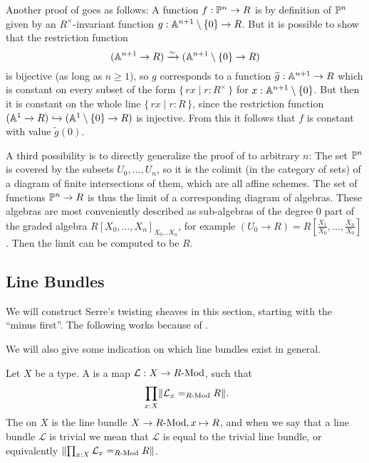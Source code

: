 \begin{remark}
  Another proof of 
  goes as follows:
  A function $f : \mathbb{P}^n \to R$
  is by definition of $\mathbb{P}^n$ given by an $R^{\times}$-invariant function
  $g : \mathbb{A}^{n+1}\setminus\{0\} \to R$.
  But it is possible to show that the restriction function
  \[ (\mathbb{A}^{n+1} \to R) \xrightarrow{\sim} (\mathbb{A}^{n+1}\setminus\{0\} \to R) \]
  is bijective
  (as long as $n \geq 1$),
  so $g$ corresponds to a function $\widetilde{g} : \mathbb{A}^{n+1} \to R$
  which is constant on every subset of the form
  $\{\, rx \mid r : R^{\times} \,\}$
  for $x : \mathbb{A}^{n+1} \setminus \{0\}$.
  But then it is constant on the whole line
  $\{\, rx \mid r : R \,\}$,
  since the restriction function
  $(\mathbb{A}^1 \to R) \hookrightarrow (\mathbb{A}^1\setminus\{0\} \to R)$
  is injective.
  From this it follows that $f$ is constant with value $\widetilde{g}(0)$.

  A third possibility is to directly generalize the proof of
   to arbitrary $n$:
  The set $\mathbb{P}^n$ is covered by the subsets $U_0, \dots, U_n$,
  so it is the colimit (in the category of sets) of a diagram
  of finite intersections of them,
  which are all affine schemes.
  The set of functions $\mathbb{P}^n \to R$
  is thus the limit of a corresponding diagram of algebras.
  These algebras are most conveniently described as sub-algebras
  of the degree $0$ part of the graded algebra
  ${R[X_0, \dots, X_n]}_{X_0 \dots X_n}$,
  for example
  $(U_0 \to R) = R[\frac{X_1}{X_0}, \dots, \frac{X_n}{X_0}]$.
  Then the limit can be computed to be $R$.
\end{remark}


\subsection{Line Bundles}

We will construct Serre's twisting sheaves in this section,
starting with the ``minus first''.
The following works because of .

We will also give some indication on which line bundles exist in general.

\begin{definition}%
  Let $X$ be a type.
  A  is a map $\mathcal L : X\to R\text{-}\mathrm{Mod}$,
  such that
  \[ \prod_{x:X} \propTrunc{\mathcal L_x=_{\Mod{R}}R} \rlap{.}\]
  The  on $X$ is the line bundle
  $X \to R\text{-}\mathrm{Mod}, x \mapsto R$,
  and when we say that a line bundle $\mathcal{L}$ is trivial
  we mean that $\mathcal{L}$ is equal to the trivial line bundle,
  or equivalently $\lVert \prod_{x:X} \mathcal L_x=_{R\text{-}\mathrm{Mod}}R \rVert$.
\end{definition}

